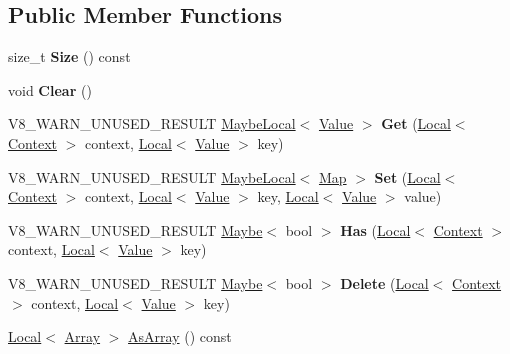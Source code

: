 \subsection*{Public Member Functions}
\begin{DoxyCompactItemize}
\item 
size\+\_\+t {\bfseries Size} () const \hypertarget{classv8_1_1_map_abed3aa2199c0f383a975208805d702ee}{}\label{classv8_1_1_map_abed3aa2199c0f383a975208805d702ee}

\item 
void {\bfseries Clear} ()\hypertarget{classv8_1_1_map_a06ee0d566d206058a7fe22c140000be4}{}\label{classv8_1_1_map_a06ee0d566d206058a7fe22c140000be4}

\item 
V8\+\_\+\+W\+A\+R\+N\+\_\+\+U\+N\+U\+S\+E\+D\+\_\+\+R\+E\+S\+U\+LT \hyperlink{classv8_1_1_maybe_local}{Maybe\+Local}$<$ \hyperlink{classv8_1_1_value}{Value} $>$ {\bfseries Get} (\hyperlink{classv8_1_1_local}{Local}$<$ \hyperlink{classv8_1_1_context}{Context} $>$ context, \hyperlink{classv8_1_1_local}{Local}$<$ \hyperlink{classv8_1_1_value}{Value} $>$ key)\hypertarget{classv8_1_1_map_a18b0a4d81e6900e854ceeabb516b5d72}{}\label{classv8_1_1_map_a18b0a4d81e6900e854ceeabb516b5d72}

\item 
V8\+\_\+\+W\+A\+R\+N\+\_\+\+U\+N\+U\+S\+E\+D\+\_\+\+R\+E\+S\+U\+LT \hyperlink{classv8_1_1_maybe_local}{Maybe\+Local}$<$ \hyperlink{classv8_1_1_map}{Map} $>$ {\bfseries Set} (\hyperlink{classv8_1_1_local}{Local}$<$ \hyperlink{classv8_1_1_context}{Context} $>$ context, \hyperlink{classv8_1_1_local}{Local}$<$ \hyperlink{classv8_1_1_value}{Value} $>$ key, \hyperlink{classv8_1_1_local}{Local}$<$ \hyperlink{classv8_1_1_value}{Value} $>$ value)\hypertarget{classv8_1_1_map_a46f73b93abc9601a9a90e2051a64bcd3}{}\label{classv8_1_1_map_a46f73b93abc9601a9a90e2051a64bcd3}

\item 
V8\+\_\+\+W\+A\+R\+N\+\_\+\+U\+N\+U\+S\+E\+D\+\_\+\+R\+E\+S\+U\+LT \hyperlink{classv8_1_1_maybe}{Maybe}$<$ bool $>$ {\bfseries Has} (\hyperlink{classv8_1_1_local}{Local}$<$ \hyperlink{classv8_1_1_context}{Context} $>$ context, \hyperlink{classv8_1_1_local}{Local}$<$ \hyperlink{classv8_1_1_value}{Value} $>$ key)\hypertarget{classv8_1_1_map_abc50dbc81ed6f6eecdb552238b97182b}{}\label{classv8_1_1_map_abc50dbc81ed6f6eecdb552238b97182b}

\item 
V8\+\_\+\+W\+A\+R\+N\+\_\+\+U\+N\+U\+S\+E\+D\+\_\+\+R\+E\+S\+U\+LT \hyperlink{classv8_1_1_maybe}{Maybe}$<$ bool $>$ {\bfseries Delete} (\hyperlink{classv8_1_1_local}{Local}$<$ \hyperlink{classv8_1_1_context}{Context} $>$ context, \hyperlink{classv8_1_1_local}{Local}$<$ \hyperlink{classv8_1_1_value}{Value} $>$ key)\hypertarget{classv8_1_1_map_a3e587498e1629ae10255f3c2a2beb9dc}{}\label{classv8_1_1_map_a3e587498e1629ae10255f3c2a2beb9dc}

\item 
\hyperlink{classv8_1_1_local}{Local}$<$ \hyperlink{classv8_1_1_array}{Array} $>$ \hyperlink{classv8_1_1_map_ac96dc797cda4ad65bcc3352f8fd74d18}{As\+Array} () const 
\end{DoxyCompactItemize}
